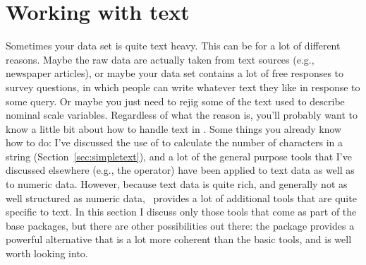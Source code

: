 \section{Working with text~\label{sec:textprocessing}}

Sometimes your data set is quite text heavy. This can be for a lot of different reasons. Maybe the raw data are actually taken from text sources (e.g., newspaper articles), or maybe your data set contains a lot of free responses to survey questions, in which people can write whatever text they like in response to some query. Or maybe you just need to rejig some of the text used to describe nominal scale variables. Regardless of what the reason is, you'll probably want to know a little bit about how to handle text in \R. Some things you already know how to do: I've discussed the use of  to calculate the number of characters in a string (Section~\ref{sec:simpletext}), and a lot of the general purpose tools that I've discussed elsewhere (e.g., the \rtext{==} operator) have been applied to text data as well as to numeric data. However, because text data is quite rich, and generally not as well structured as numeric data, \R\ provides a lot of additional tools that are quite specific to text. In this section I discuss only those tools that come as part of the base packages, but there are other possibilities out there: the  package provides a powerful alternative that is a lot more coherent than the basic tools, and is well worth looking into.




